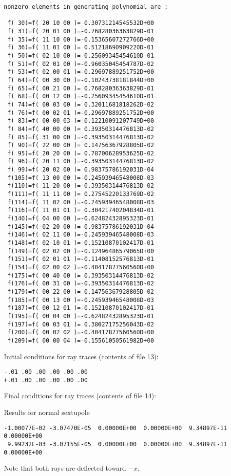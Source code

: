 \begin{footnotesize}
\begin{verbatim}
nonzero elements in generating polynomial are :

 f( 30)=f( 20 10 00 )= 0.30731214545532D+00
 f( 31)=f( 20 01 00 )=-0.76828036363829D-01
 f( 35)=f( 11 10 00 )=-0.15365607272766D+00
 f( 36)=f( 11 01 00 )= 0.51218690909220D-01
 f( 50)=f( 02 10 00 )= 0.25609345454610D-01
 f( 51)=f( 02 01 00 )=-0.96035045454787D-02
 f( 53)=f( 02 00 01 )=-0.29697889251752D+00
 f( 64)=f( 00 30 00 )=-0.10243738181844D+00
 f( 65)=f( 00 21 00 )= 0.76828036363829D-01
 f( 68)=f( 00 12 00 )=-0.25609345454610D-01
 f( 74)=f( 00 03 00 )= 0.32011681818262D-02
 f( 76)=f( 00 02 01 )=-0.29697889251752D+00
 f( 83)=f( 00 00 03 )=-0.12210091207749D+00
 f( 84)=f( 40 00 00 )= 0.39350314476813D-02
 f( 85)=f( 31 00 00 )=-0.39350314476813D-02
 f( 90)=f( 22 00 00 )= 0.14756367928805D-02
 f( 95)=f( 20 20 00 )= 0.78700628953625D-02
 f( 96)=f( 20 11 00 )=-0.39350314476813D-02
 f( 99)=f( 20 02 00 )= 0.98375786192031D-04
 f(105)=f( 13 00 00 )=-0.24593946548008D-03
 f(110)=f( 11 20 00 )=-0.39350314476813D-02
 f(111)=f( 11 11 00 )= 0.27545220133769D-02
 f(114)=f( 11 02 00 )=-0.24593946548008D-03
 f(116)=f( 11 01 01 )= 0.30421740204834D-01
 f(140)=f( 04 00 00 )=-0.62482432895323D-01
 f(145)=f( 02 20 00 )= 0.98375786192031D-04
 f(146)=f( 02 11 00 )=-0.24593946548008D-03
 f(148)=f( 02 10 01 )= 0.15210870102417D-01
 f(149)=f( 02 02 00 )=-0.12496486579065D+00
 f(151)=f( 02 01 01 )=-0.11408152576813D-01
 f(154)=f( 02 00 02 )=-0.40417877560560D+00
 f(175)=f( 00 40 00 )= 0.39350314476813D-02
 f(176)=f( 00 31 00 )=-0.39350314476813D-02
 f(179)=f( 00 22 00 )= 0.14756367928805D-02
 f(185)=f( 00 13 00 )=-0.24593946548008D-03
 f(187)=f( 00 12 01 )=-0.15210870102417D-01
 f(195)=f( 00 04 00 )=-0.62482432895323D-01
 f(197)=f( 00 03 01 )= 0.38027175256043D-02
 f(200)=f( 00 02 02 )=-0.40417877560560D+00
 f(209)=f( 00 00 04 )=-0.15561050561982D+00
\end{verbatim}
\end{footnotesize}
Initial conditions for ray traces (contents of file 13):
\begin{footnotesize}
\begin{verbatim}
-.01 .00 .00 .00 .00 .00
+.01 .00 .00 .00 .00 .00
\end{verbatim}
\end{footnotesize}
Final conditions for ray traces (contents of file 14):
\vspace{5mm}

\noindent Results for normal sextupole
\begin{footnotesize}
\begin{verbatim}
-1.00077E-02 -3.07470E-05  0.00000E+00  0.00000E+00  9.34897E-11  0.00000E+00
 9.99232E-03 -3.07155E-05  0.00000E+00  0.00000E+00  9.34897E-11  0.00000E+00
\end{verbatim}
\end{footnotesize}
Note that both rays are deflected toward $-x$.
\vspace{5mm}

